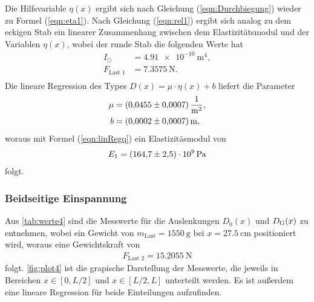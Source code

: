 \sloppy
Die Hilfsvariable $\eta(x)$ ergibt sich nach Gleichung (\ref{eqn:Durchbiegung}) wieder zu Formel (\ref{eqn:eta1}).
Nach Gleichung (\ref{eqn:rel1}) ergibt sich analog zu dem eckigen Stab ein linearer Zusammenhang zwischen dem Elastizitätsmodul und
der Variablen $\eta(x)$, wobei der runde Stab die folgenden Werte hat
\begin{align*}
  I_{\bigcirc} &= \SI{4.91e-10}{\meter^4}, \\
  F_{\text{Last 1}} &= \SI{7.3575}{\newton}. \\
\end{align*}
Die lineare Regression des Types $D(x) = \mu\cdot\eta(x)+b$ liefert die Parameter
\begin{align*}
  \mu &= \SI{0.0455 (0.0007)}{\per\square\meter},\\
  b &= \SI{0.0002 (0.0007)}{\meter}, \\
\end{align*}
woraus mit Formel (\ref{eqn:linRegq}) ein Elastizitäsmodul von
\begin{align*}
  E_1 = \SI{164.7 (2.5)e9}{\Pa}
\end{align*}
folgt.


\subsubsection{Beidseitige Einspannung}
\label{subsubsec:rundBeidEins}
Aus \autoref{tab:werte4} sind die Messwerte für die Auslenkungen $D_0(x)$ und $D_{\text G}(x)$ zu entnehmen, wobei ein Gewicht von
$m_{\text{Last}}=\SI{1550}{\gram}$ bei $x=\SI{27.5}{\cm}$ positioniert wird, woraus eine Gewichtskraft von 
\begin{align*}
  F_{\text{Last 2}} = \SI{15.2055}{\newton}
\end{align*}
folgt. \autoref{fig:plot4} ist die grapische Darstellung der Messwerte, die 
jeweils in Bereichen $x \in [0, L/2] $ und 
$x \in [L/2,L]$ unterteilt werden. Es ist außerdem eine lineare Regression für beide Einteilungen
aufzufinden.


